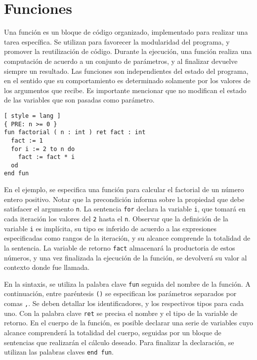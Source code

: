 


\iffalse
\section{Funciones}

Una función es un bloque de código organizado, implementado para realizar una tarea específica.
Se utilizan para favorecer la modularidad del programa, y promover la reutilización de código.
Durante la ejecución, una función realiza una computación de acuerdo a un conjunto de parámetros, y al finalizar devuelve siempre un resultado.
Las funciones son independientes del estado del programa, en el sentido que su comportamiento es determinado solamente por los valores de los argumentos que recibe.
Es importante mencionar que no modifican el estado de las variables que son pasadas como parámetro.

\begin{lstlisting}[ style = lang ]
{ PRE: n >= 0 }
fun factorial ( n : int ) ret fact : int
  fact := 1
  for i := 2 to n do
    fact := fact * i
  od
end fun
\end{lstlisting}

En el ejemplo, se especifica una función para calcular el factorial de un número entero positivo.
Notar que la precondición informa sobre la propiedad que debe satisfacer el argumento \lstinline[style = lang]{n}.
La sentencia \lstinline[style = lang]{for} declara la variable \lstinline[style = lang]{i}, que tomará en cada iteración los valores del \lstinline[style = lang]{2} hasta el \lstinline[style = lang]{n}.
Observar que la definición de la variable \lstinline[style = lang]{i} es implícita, su tipo es inferido de acuerdo a las expresiones especificadas como rangos de la iteración, y su alcance comprende la totalidad de la sentencia.
La variable de retorno \lstinline[style = lang]{fact} almacenará la productoria de estos números, y una vez finalizada la ejecución de la función, se devolverá su valor al contexto donde fue llamada.

En la sintaxis, se utiliza la palabra clave \lstinline[style = lang]{fun} seguida del nombre de la función.
A continuación, entre paréntesis \lstinline[style = lang]{()} se especifican los parámetros separados por comas \lstinline[style = lang]{,}.
Se deben detallar los identificadores, y los respectivos tipos para cada uno.
Con la palabra clave \lstinline[style = lang]{ret} se precisa el nombre y el tipo de la variable de retorno.
En el cuerpo de la función, es posible declarar una serie de variables cuyo alcance comprenderá la totalidad del cuerpo, seguidas por un bloque de sentencias que realizarán el cálculo deseado.
Para finalizar la declaración, se utilizan las palabras claves \lstinline[style = lang]{end fun}.

